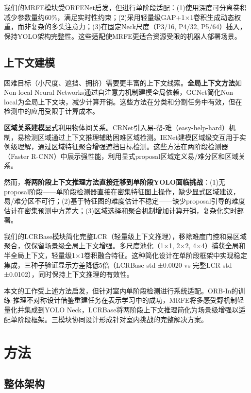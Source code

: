 \documentclass[journal]{IEEEtran}
\begin{document}
我们的MRFE模块受ORFENet启发，但进行单阶段适配：(1)使用深度可分离卷积减少参数量约60\%，满足实时性约束；(2)采用轻量级GAP+1$\times$1卷积生成动态权重，而非复杂的多头注意力；(3)在固定Neck尺度（P3/16, P4/32, P5/64）插入，保持YOLO架构完整性。这些适配使MRFE更适合资源受限的机器人部署场景。

\subsection{上下文建模}
\label{subsec:context_modeling}

困难目标（小尺度、遮挡、拥挤）需要更丰富的上下文线索。\textbf{全局上下文方法}如Non-local Neural Networks\cite{wang2018non}通过自注意力机制建模全局依赖，GCNet\cite{cao2019gcnet}简化Non-local为全局上下文块，减少计算开销。这些方法在分类和分割任务中有效，但在检测中的应用受限于计算成本。

\textbf{区域关系建模}显式利用物体间关系。CRNet\cite{chi2020crnet}引入易-帮-难（easy-help-hard）机制，易检测区域通过上下文推理辅助困难区域检测。IENet\cite{hu2021ienet}建模区域级交互用于实例级理解，通过区域特征聚合增强遮挡目标检测。这些方法在两阶段检测器（Faster R-CNN）中展示强性能，利用显式proposal区域定义易/难分区和区域关系。

然而，\textbf{将两阶段上下文推理方法直接迁移到单阶段YOLO面临挑战}：(1)无proposal阶段——单阶段检测器直接在密集特征图上操作，缺少显式区域建议，易/难分区不可行；(2)基于特征图的难度估计不稳定——缺少proposal引导的难度估计在密集预测中方差大；(3)区域选择和聚合机制增加计算开销，复杂化实时部署。

我们的LCRBase模块简化完整LCR（轻量级上下文推理），移除难度门控和易区域聚合，仅保留场景级全局上下文增强。多尺度池化（1$\times$1, 2$\times$2, 4$\times$4）捕获全局和半全局上下文，轻量级1$\times$1卷积融合特征。这种简化设计在单阶段框架中实现稳定集成，三种子验证显示方差降低5倍（LCRBase std ±0.0020 vs 完整LCR std ±0.0102），同时保持上下文推理的有效性。

本文的工作受上述方法启发，但针对室内单阶段检测进行系统适配。ORB-In的训练-推理不对称设计借鉴重建任务在表示学习中的成功，MRFE将多感受野机制轻量化并集成到YOLO Neck，LCRBase将两阶段上下文推理简化为场景级增强以适配单阶段框架。三模块协同设计形成针对室内挑战的完整解决方案。


\section{方法}
\label{sec:methodology}

\subsection{整体架构}
\label{subsec:overall_architecture}
\end{document}
